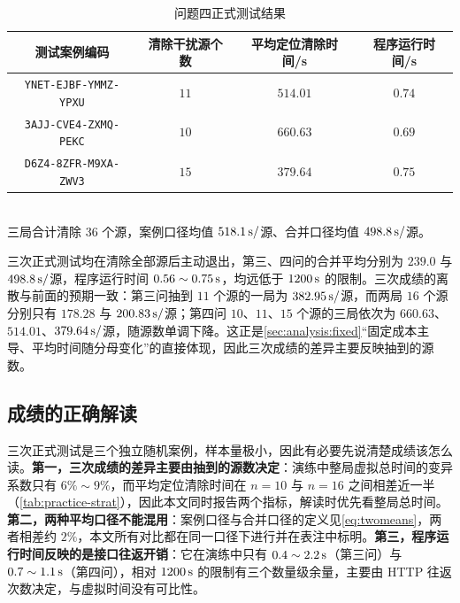 \begin{table}[!htbp]
  \caption{问题四正式测试结果}\label{tab:formal4}\centering\small
  \begin{tabular}{cccc}
    \toprule[1.5pt]
    测试案例编码 & 清除干扰源个数 & 平均定位清除时间/s & 程序运行时间/s \\
    \midrule[1pt]
    \texttt{YNET-EJBF-YMMZ-YPXU} & $11$ & $514.01$ & $0.74$ \\
    \texttt{3AJJ-CVE4-ZXMQ-PEKC} & $10$ & $660.63$ & $0.69$ \\
    \texttt{D6Z4-8ZFR-M9XA-ZWV3} & $15$ & $379.64$ & $0.75$ \\
    \bottomrule[1.5pt]
  \end{tabular}\\[2pt]
  \footnotesize 三局合计清除 $36$ 个源，案例口径均值 $518.1\,\mathrm{s}/$源、合并口径均值 $498.8\,\mathrm{s}/$源。
\end{table}

三次正式测试均在清除全部源后主动退出，第三、四问的合并平均分别为 $239.0$ 与 $498.8\,\mathrm{s}/$源，程序运行时间 $0.56\sim0.75\,\mathrm{s}$，均远低于 $1200\,\mathrm{s}$ 的限制。三次成绩的离散与前面的预期一致：第三问抽到 $11$ 个源的一局为 $382.95\,\mathrm{s}/$源，而两局 $16$ 个源分别只有 $178.28$ 与 $200.83\,\mathrm{s}/$源；第四问 $10$、$11$、$15$ 个源的三局依次为 $660.63$、$514.01$、$379.64\,\mathrm{s}/$源，随源数单调下降。这正是\cref{sec:analysis:fixed}“固定成本主导、平均时间随分母变化”的直接体现，因此三次成绩的差异主要反映抽到的源数。

\subsection{成绩的正确解读}

三次正式测试是三个独立随机案例，样本量极小，因此有必要先说清楚成绩该怎么读。\textbf{第一，三次成绩的差异主要由抽到的源数决定}：演练中整局虚拟总时间的变异系数只有 $6\%\sim9\%$，而平均定位清除时间在 $n=10$ 与 $n=16$ 之间相差近一半（\cref{tab:practice-strat}），因此本文同时报告两个指标，解读时优先看整局总时间。\textbf{第二，两种平均口径不能混用}：案例口径与合并口径的定义见\cref{eq:twomeans}，两者相差约 $2\%$，本文所有对比都在同一口径下进行并在表注中标明。\textbf{第三，程序运行时间反映的是接口往返开销}：它在演练中只有 $0.4\sim2.2\,\mathrm{s}$（第三问）与 $0.7\sim1.1\,\mathrm{s}$（第四问），相对 $1200\,\mathrm{s}$ 的限制有三个数量级余量，主要由 HTTP 往返次数决定，与虚拟时间没有可比性。
